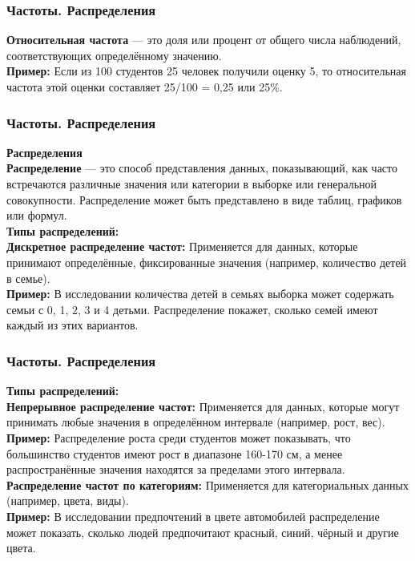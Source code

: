 \documentclass[aspectratio=169]{beamer}
\begin{document}
\begin{frame}
\frametitle{Частоты. Распределения}
\textbf{Относительная частота} — это доля или процент от общего числа наблюдений, соответствующих определённому значению.
\newline\\
\textbf{Пример:} Если из 100 студентов 25 человек получили оценку 5, то относительная частота этой оценки составляет 25/100 = 0,25 или 25\%.
\end{frame}

\begin{frame}
\frametitle{Частоты. Распределения}
\textbf{Распределения}
\newline\\
\textbf{Распределение} — это способ представления данных, показывающий, как часто встречаются различные значения или категории в выборке или генеральной совокупности. Распределение может быть представлено в виде таблиц, графиков или формул.
\newline\\
\textbf{Типы распределений:}
\newline\\
\textbf{Дискретное распределение частот:} Применяется для данных, которые принимают определённые, фиксированные значения (например, количество детей в семье).
\newline\\
\textbf{Пример:} В исследовании количества детей в семьях выборка может содержать семьи с 0, 1, 2, 3 и 4 детьми. Распределение покажет, сколько семей имеют каждый из этих вариантов.
\end{frame}

\begin{frame}
\frametitle{Частоты. Распределения}
\textbf{Типы распределений:}
\newline\\
\textbf{Непрерывное распределение частот:} Применяется для данных, которые могут принимать любые значения в определённом интервале (например, рост, вес).
\newline\\
\textbf{Пример:} Распределение роста среди студентов может показывать, что большинство студентов имеют рост в диапазоне 160-170 см, а менее распространённые значения находятся за пределами этого интервала.
\newline\\
\textbf{Распределение частот по категориям:} Применяется для категориальных данных (например, цвета, виды).
\newline\\
\textbf{Пример:} В исследовании предпочтений в цвете автомобилей распределение может показать, сколько людей предпочитают красный, синий, чёрный и другие цвета.
\end{frame}
\end{document}
